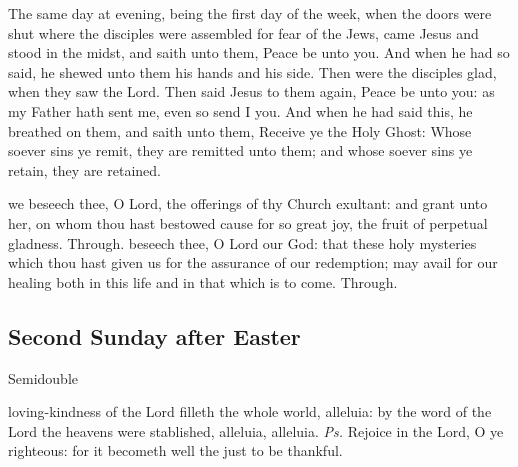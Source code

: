 
 The same day at evening, being the first day of the week, when the doors were shut where the disciples were assembled for fear of the Jews, came Jesus and stood in the midst, and saith unto them, Peace be unto you. And when he had so said, he shewed unto them his hands and his side. Then were the disciples glad, when they saw the Lord. Then said Jesus to them again, Peace be unto you: as my Father hath sent me, even so send I you. And when he had said this, he breathed on them, and saith unto them, Receive ye the Holy Ghost: Whose soever sins ye remit, they are remitted unto them; and whose soever sins ye retain, they are retained.

\secret
{} we beseech thee, O Lord, the offerings of thy Church exultant: and grant unto her, on whom thou hast bestowed cause for so great joy, the fruit of perpetual gladness. Through.
\postcommunion
{} beseech thee, O Lord our God: that these holy mysteries which thou hast given us for the assurance of our redemption; may avail for our healing both in this life and in that which is to come. Through.


\clearpage
\subsection{Second Sunday after Easter}\label{EasterII}
\begin{inhead}
    {Semidouble}
\end{inhead}


\introit
{} loving-kindness of the Lord filleth the whole world, alleluia: by the word of the Lord the heavens were stablished, alleluia, alleluia. \textit{Ps.} Rejoice in the Lord, O ye righteous: for it becometh well the just to be thankful.

